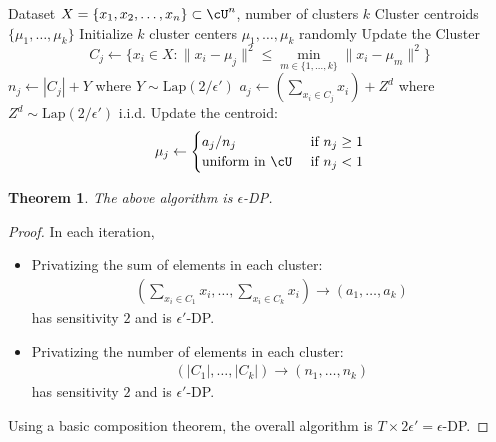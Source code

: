 \documentclass[11pt, a4paper]{article}
\newtheorem{theorem}{Theorem}
\begin{document}
\begin{algorithm}[h!]
\caption{DP k-Means Clustering}
\begin{algorithmic}[1]
\REQUIRE Dataset $X = \{x_1, x_2, \dots, x_n\} \subset \cU^n$, number of clusters $k$
\ENSURE Cluster centroids $\{\mu_1, \dots, \mu_k\}$
\STATE Initialize $k$ cluster centers $\mu_1, \dots, \mu_k$ randomly
    \STATE  Update the Cluster
        \[
        C_j \leftarrow \{ x_i \in X: \|x_i - \mu_j\|^2 \leq \min_{m \in \{1, \dots, k\}} \|x_i - \mu_m\|^2\}
        \]
    \ENDFOR
        \STATE $n_j \leftarrow  |C_j| + Y$ where $Y\sim \mbox{Lap}(2/\epsilon')$
        \STATE $a_j \leftarrow \left(\sum_{x_i \in C_j} x_i \right) + Z^d$ where $Z^d\sim \mbox{Lap}(2/\epsilon')$ i.i.d.
        \STATE Update the centroid:
        \[
        \mu_j \leftarrow 
        \begin{cases}
            a_j / n_j &\mbox{ if $n_j \geq 1$}\\
            \mbox{uniform in $\cU$} &\mbox{ if $n_j < 1$}\\
        \end{cases}
        \]
    \ENDFOR
\ENDFOR
\end{algorithmic}
\end{algorithm}

\begin{theorem}
    The above algorithm is $\epsilon$-DP.
\end{theorem}
\begin{proof}
    In each iteration,
    \begin{itemize}
        \item  Privatizing the sum of elements in each cluster:
    \begin{align}
        \left(\sum_{x_i\in C_1} x_i, \dots, \sum_{x_i\in C_k} x_i \right) \rightarrow (a_1, \dots, a_k)
    \end{align}
    has sensitivity $2$ and is $\epsilon'$-DP.
        \item Privatizing the number of elements in each cluster:
    \begin{align}
        (|C_1|, \dots, |C_k|) \rightarrow (n_1, \dots, n_k)
    \end{align}
    has sensitivity $2$ and is $\epsilon'$-DP.
    \end{itemize}
    Using a basic composition theorem, the overall algorithm is $T \times 2\epsilon' = \epsilon$-DP.
\end{proof}
\end{document}
